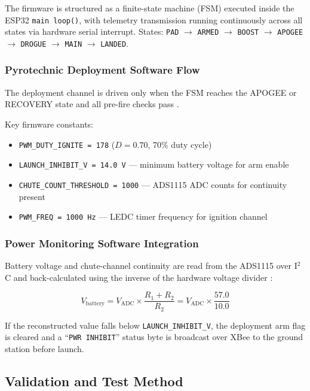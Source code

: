 The firmware is structured as a finite-state machine (FSM) executed inside the
ESP32 \texttt{main loop()}, with telemetry transmission running continuously
across all states via hardware serial interrupt. States:
\texttt{PAD} $\to$ \texttt{ARMED} $\to$ \texttt{BOOST} $\to$ \texttt{APOGEE}
$\to$ \texttt{DROGUE} $\to$ \texttt{MAIN} $\to$ \texttt{LANDED}.

\subsubsection{Pyrotechnic Deployment Software Flow}

The deployment channel is driven only when the FSM reaches the APOGEE or
RECOVERY state and all pre-fire checks pass \cite{n4_pyro_control,n4_pwm_config}.

Key firmware constants:
\begin{itemize}
  \item \texttt{PWM\_DUTY\_IGNITE = 178} ($D = 0.70$, 70\% duty cycle)
  \item \texttt{LAUNCH\_INHIBIT\_V = 14.0\,V} --- minimum battery voltage for
    arm enable
  \item \texttt{CHUTE\_COUNT\_THRESHOLD = 1000} --- ADS1115 ADC counts for
    continuity present
  \item \texttt{PWM\_FREQ = 1000\,Hz} --- LEDC timer frequency for ignition
    channel
\end{itemize}

\subsubsection{Power Monitoring Software Integration}

Battery voltage and chute-channel continuity are read from the ADS1115 over
I$^2$C and back-calculated using the inverse of the hardware voltage
divider \cite{ads1115_datasheet,voltage_divider_theory}:

\begin{equation}
  V_\mathrm{battery} = V_\mathrm{ADC} \times \frac{R_1 + R_2}{R_2} = V_\mathrm{ADC} \times \frac{57.0}{10.0}
  \label{eq:vbat_reconstruct}
\end{equation}

If the reconstructed value falls below \texttt{LAUNCH\_INHIBIT\_V}, the deployment
arm flag is cleared and a ``\texttt{PWR INHIBIT}'' status byte is broadcast over
XBee to the ground station before launch.

\subsection{Validation and Test Method}

